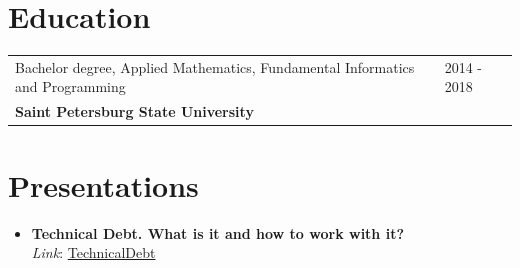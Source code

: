 \documentclass[a4paper,10pt]{article}
\begin{document}
\section{Education}
\begin{tabularx}{\linewidth}{@{}l X@{}}	

Bachelor degree, Applied Mathematics, Fundamental Informatics and
Programming & \hfill 2014 - 2018\\ 
\textbf{Saint Petersburg State University}

\end{tabularx}

\section{Presentations}
\begin{itemize}
\itemsep -7pt {}
\item{\textbf{Technical Debt. What is it and how to work with it?}\\ \textit{Link}: \href{https://github.com/Loriens/TechnicalDebt}{TechnicalDebt}}
\end{itemize}
\end{document}
